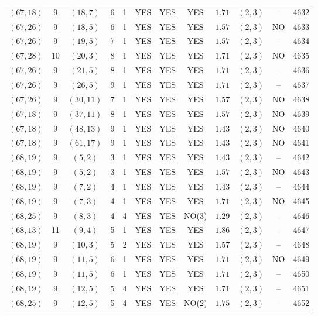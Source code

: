 \begin{longtable}{|c|c|c|c|c|c|c|c|c|c|c|c|}
$(67,18)$ & 9 & $(18,7)$ & 6 & 1 & YES & YES & YES & $1.71$ & $(2,3)$ & -- & 4632\\
$(67,26)$ & 9 & $(18,5)$ & 6 & 1 & YES & YES & YES & $1.57$ & $(2,3)$ & NO & 4633\\
$(67,26)$ & 9 & $(19,5)$ & 7 & 1 & YES & YES & YES & $1.57$ & $(2,3)$ & -- & 4634\\
$(67,28)$ & 10 & $(20,3)$ & 8 & 1 & YES & YES & YES & $1.71$ & $(2,3)$ & NO & 4635\\
$(67,26)$ & 9 & $(21,5)$ & 8 & 1 & YES & YES & YES & $1.71$ & $(2,3)$ & -- & 4636\\
$(67,26)$ & 9 & $(26,5)$ & 9 & 1 & YES & YES & YES & $1.71$ & $(2,3)$ & -- & 4637\\
$(67,26)$ & 9 & $(30,11)$ & 7 & 1 & YES & YES & YES & $1.57$ & $(2,3)$ & NO & 4638\\
$(67,18)$ & 9 & $(37,11)$ & 8 & 1 & YES & YES & YES & $1.57$ & $(2,3)$ & NO & 4639\\
$(67,18)$ & 9 & $(48,13)$ & 9 & 1 & YES & YES & YES & $1.43$ & $(2,3)$ & NO & 4640\\
$(67,18)$ & 9 & $(61,17)$ & 9 & 1 & YES & YES & YES & $1.43$ & $(2,3)$ & NO & 4641\\
$(68,19)$ & 9 & $(5,2)$ & 3 & 1 & YES & YES & YES & $1.43$ & $(2,3)$ & -- & 4642\\
$(68,19)$ & 9 & $(5,2)$ & 3 & 1 & YES & YES & YES & $1.57$ & $(2,3)$ & NO & 4643\\
$(68,19)$ & 9 & $(7,2)$ & 4 & 1 & YES & YES & YES & $1.43$ & $(2,3)$ & -- & 4644\\
$(68,19)$ & 9 & $(7,3)$ & 4 & 1 & YES & YES & YES & $1.71$ & $(2,3)$ & NO & 4645\\
$(68,25)$ & 9 & $(8,3)$ & 4 & 4 & YES & YES & NO(3) & $1.29$ & $(2,3)$ & -- & 4646\\
$(68,13)$ & 11 & $(9,4)$ & 5 & 1 & YES & YES & YES & $1.86$ & $(2,3)$ & -- & 4647\\
$(68,19)$ & 9 & $(10,3)$ & 5 & 2 & YES & YES & YES & $1.57$ & $(2,3)$ & -- & 4648\\
$(68,19)$ & 9 & $(11,5)$ & 6 & 1 & YES & YES & YES & $1.71$ & $(2,3)$ & NO & 4649\\
$(68,19)$ & 9 & $(11,5)$ & 6 & 1 & YES & YES & YES & $1.71$ & $(2,3)$ & -- & 4650\\
$(68,19)$ & 9 & $(12,5)$ & 5 & 4 & YES & YES & YES & $1.71$ & $(2,3)$ & -- & 4651\\
$(68,25)$ & 9 & $(12,5)$ & 5 & 4 & YES & YES & NO(2) & $1.75$ & $(2,3)$ & -- & 4652\\

\end{longtable}
